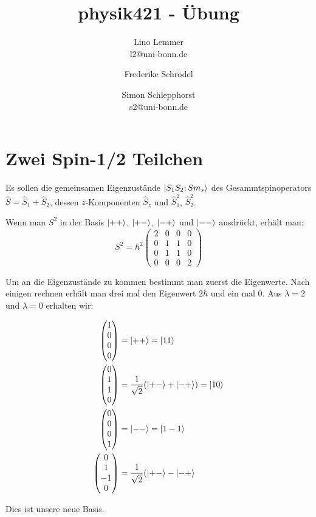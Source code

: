 

\setcounter{thezettel}{10}
\renewcommand\thesection{\arabic{thezettel}.\arabic{section}}



\title{physik421 - Übung }
\author{Lino Lemmer \\ \small{l2@uni-bonn.de} \and Frederike Schrödel \and Simon Schlepphorst\\ \small{s2@uni-bonn.de}}


\maketitle

\section{Zwei Spin-1/2 Teilchen}
Es sollen die gemeinsamen Eigenzustände $\left|S_1S_2;Sm_s\right\rangle$ des Gesammtspinoperators $\hat S=\hat S_1+\hat S_2$, dessen $z$-Komponenten $\hat S_z$ und $\hat S_1^2$, $\hat S_2^2$.

Wenn man $S^2$ in der Basis $\left|++\right\rangle$, $\left|+-\right\rangle$, $\left|-+\right\rangle$ und $\left|--\right\rangle$ ausdrückt, erhält man:
\[
    S^2 = \hbar^2 \begin{pmatrix}
        2 &0 &0 &0 \\
        0 &1 &1 &0 \\
        0 &1 &1 &0 \\
        0 &0 &0 &2
    \end{pmatrix}
\]

Um an die Eigenzustände zu kommen bestimmt man zuerst die Eigenwerte. Nach einigen rechnen erhält man drei mal den Eigenwert $2\hbar$ und ein mal 0. 
Aus $\lambda = 2$ und $\lambda = 0$ erhalten wir:

\begin{align*}
\begin{pmatrix} 1 \\ 0 \\ 0 \\ 0 \end{pmatrix} &= \left|++\right\rangle = \left|11\right\rangle \\
\begin{pmatrix} 0 \\ 1 \\ 1 \\ 0 \end{pmatrix} &= \frac{1}{\sqrt 2}(\left|+-\right\rangle+\left|-+\right\rangle) = \left|10\right\rangle \\
\begin{pmatrix} 0 \\ 0 \\ 0 \\ 1 \end{pmatrix} &= \left|--\right\rangle = \left|1-1\right\rangle \\
\begin{pmatrix} 0 \\ 1 \\ -1 \\ 0 \end{pmatrix} &=\frac 1{\sqrt 2}(\left|+-\right\rangle-\left|-+\right\rangle \\
\end{align*}

Dies ist unsere neue Basis.


